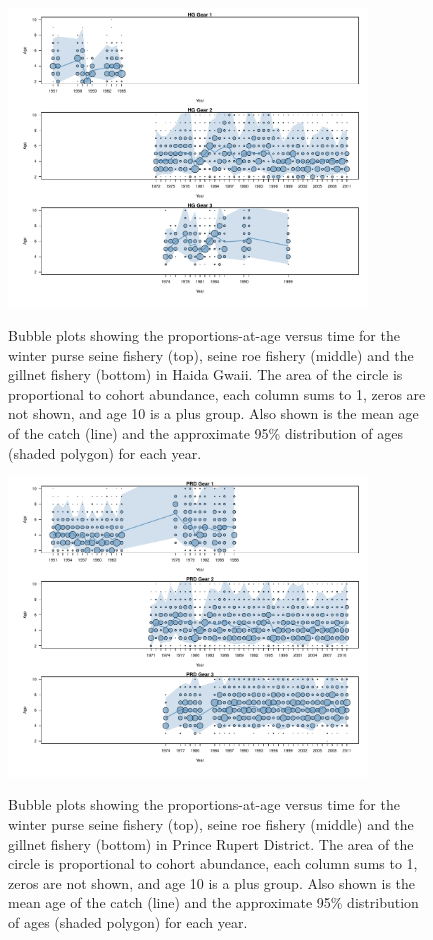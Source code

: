 \begin{figure}
	\centering
	\includegraphics[width=0.85\textwidth]{../Figs/iscam_fig_AgeCompsHG.pdf}\\
	\caption{Bubble plots showing the proportions-at-age versus time for the winter purse seine fishery (top), seine roe fishery (middle) and the gillnet fishery (bottom) in Haida Gwaii.  The area of the circle is proportional to cohort abundance, each column sums to 1, zeros are not shown, and age 10 is a plus group. Also shown is the mean age of the catch (line) and the approximate 95\% distribution of ages (shaded polygon) for each year.}\label{FigAgeCompsHG}
\end{figure}

\begin{figure}
	\centering
	\includegraphics[width=0.85\textwidth]{../Figs/iscam_fig_AgeCompsPRD.pdf}\\
	\caption{Bubble plots showing the proportions-at-age versus time for the winter purse seine fishery (top), seine roe fishery (middle) and the gillnet fishery (bottom) in Prince Rupert District.  The area of the circle is proportional to cohort abundance, each column sums to 1, zeros are not shown, and age 10 is a plus group. Also shown is the mean age of the catch (line) and the approximate 95\% distribution of ages (shaded polygon) for each year.}\label{FigAgeCompsPRD}
\end{figure}

